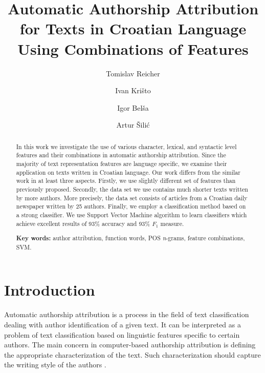 \documentclass{llncs}
\begin{document}
\title{Automatic Authorship Attribution\\ for Texts in Croatian Language\\ Using
Combinations of Features}
\author{Tomislav Reicher \and Ivan Krišto \and Igor Belša \and Artur Šilić}

\maketitle

\begin{abstract}
In this work we investigate the use of various character, lexical, and syntactic
level features and their combinations in automatic authorship attribution. Since
the majority of text representation features are language specific, we examine
their application on texts written in Croatian language. Our work differs from
the similar work in at least three aspects. Firstly, we use slightly different
set of features than previously proposed. Secondly, the data set we use contains much
shorter texts written by more authors. More precisely, the data set consists of
articles from a Croatian daily newspaper written by 25 authors. Finally, we
employ a classification method based on a strong classifier. We use Support Vector
Machine algorithm to learn classifiers which achieve excellent results of 93\%
accuracy and 93\% $F_1$ measure.

\vspace{10pt}
\textbf{Key words:} author attribution, function words, POS \emph{n}-grams,
feature combinations, SVM.
\end{abstract}


\section{Introduction}
Automatic authorship attribution is a process in the field of text classification
dealing with author identification of a given text. It can be interpreted
as a problem of text classification based on linguistic features specific to certain
authors. The main concern in computer-based authorship attribution is defining
the appropriate characterization of the text. Such characterization should
capture the writing style of the authors \cite{coyotl2006authorship}.
\end{document}
